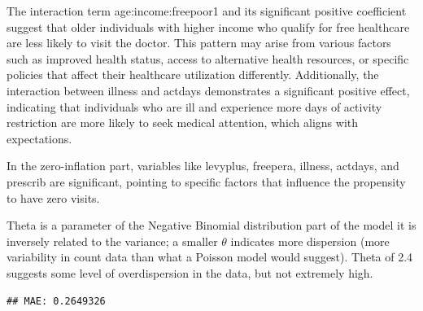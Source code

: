 \documentclass[
]{article}
\newenvironment{Shaded}{\begin{snugshade}}{\end{snugshade}}
\newcommand{\AttributeTok}[1]{\textcolor[rgb]{0.13,0.29,0.53}{#1}}
\newcommand{\DecValTok}[1]{\textcolor[rgb]{0.00,0.00,0.81}{#1}}
\newcommand{\FunctionTok}[1]{\textcolor[rgb]{0.13,0.29,0.53}{\textbf{#1}}}
\newcommand{\NormalTok}[1]{#1}
\newcommand{\OtherTok}[1]{\textcolor[rgb]{0.56,0.35,0.01}{#1}}
\newcommand{\SpecialCharTok}[1]{\textcolor[rgb]{0.81,0.36,0.00}{\textbf{#1}}}
\newcommand{\StringTok}[1]{\textcolor[rgb]{0.31,0.60,0.02}{#1}}
\begin{document}
The interaction term age:income:freepoor1 and its significant positive
coefficient suggest that older individuals with higher income who
qualify for free healthcare are less likely to visit the doctor. This
pattern may arise from various factors such as improved health status,
access to alternative health resources, or specific policies that affect
their healthcare utilization differently. Additionally, the interaction
between illness and actdays demonstrates a significant positive effect,
indicating that individuals who are ill and experience more days of
activity restriction are more likely to seek medical attention, which
aligns with expectations.

In the zero-inflation part, variables like levyplus, freepera, illness,
actdays, and prescrib are significant, pointing to specific factors that
influence the propensity to have zero visits.

Theta is a parameter of the Negative Binomial distribution part of the
model it is inversely related to the variance; a smaller \(\theta\)
indicates more dispersion (more variability in count data than what a
Poisson model would suggest). Theta of 2.4 suggests some level of
overdispersion in the data, but not extremely high.

\begin{Shaded}
\end{Shaded}

\begin{verbatim}
## MAE: 0.2649326
\end{verbatim}
\end{document}
